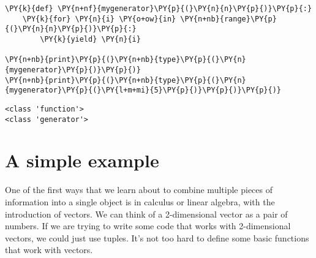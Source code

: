 \begin{Verbatim}[commandchars=\\\{\}]
\PY{k}{def} \PY{n+nf}{mygenerator}\PY{p}{(}\PY{n}{n}\PY{p}{)}\PY{p}{:}
    \PY{k}{for} \PY{n}{i} \PY{o+ow}{in} \PY{n+nb}{range}\PY{p}{(}\PY{n}{n}\PY{p}{)}\PY{p}{:}
        \PY{k}{yield} \PY{n}{i}

\PY{n+nb}{print}\PY{p}{(}\PY{n+nb}{type}\PY{p}{(}\PY{n}{mygenerator}\PY{p}{)}\PY{p}{)}
\PY{n+nb}{print}\PY{p}{(}\PY{n+nb}{type}\PY{p}{(}\PY{n}{mygenerator}\PY{p}{(}\PY{l+m+mi}{5}\PY{p}{)}\PY{p}{)}\PY{p}{)}
\end{Verbatim}

\begin{Verbatim}
<class 'function'>
<class 'generator'>

\end{Verbatim}

\section{A simple example}


One of the first ways that we learn about to combine multiple pieces of information into a single object is in calculus or linear algebra, with the introduction of vectors.  We can think of a 2-dimensional vector as a pair of numbers.  If we are trying to write some code that works with 2-dimensional vectors, we could just use tuples.  It's not too hard to define some basic functions that work with vectors.


